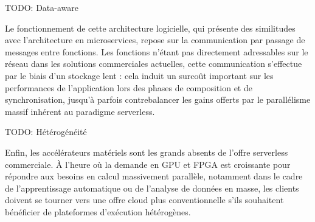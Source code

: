 TODO: Data-aware

Le fonctionnement de cette architecture logicielle, qui présente des similitudes avec l'architecture en microservices, repose sur la communication par passage de messages entre fonctions. Les fonctions n'étant pas directement adressables sur le réseau dans les solutions commerciales actuelles, cette communication s'effectue par le biais d'un stockage lent : cela induit un surcoût important sur les performances de l'application lors des phases de composition et de synchronisation, jusqu'à parfois contrebalancer les gains offerts par le parallélisme massif inhérent au paradigme serverless.

TODO: Hétérogénéité

Enfin, les accélérateurs matériels sont les grands absents de l'offre serverless commerciale. À l'heure où la demande en \gls{GPU} et \gls{FPGA} est croissante pour répondre aux besoins en calcul massivement parallèle, notamment dans le cadre de l'apprentissage automatique ou de l'analyse de données en masse, les clients doivent se tourner vers une offre cloud plus conventionnelle s'ils souhaitent bénéficier de plateformes d'exécution hétérogènes.

